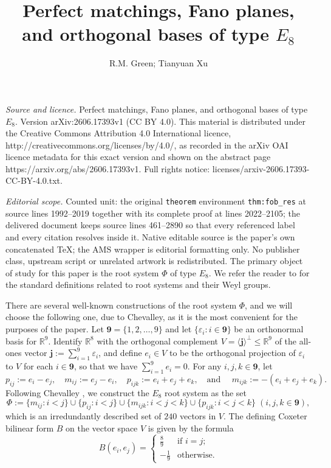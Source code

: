 \documentclass[10pt,a4paper]{amsart}
\numberwithin{equation}{section}
\newcommand{\ep}{\varepsilon}
\newcommand{\R}{{\mathbb R}}
\newcommand{\allroots}{\Phi}
\newcommand{\bfj}{\mathbf{j}}
\newcommand{\mr}{m}
\newcommand{\pr}{p}
\newcommand{\nine}{\mathbf{9}}
\begin{document}
\title[Perfect matchings, Fano planes, and orthogonal bases of type]{Perfect matchings, Fano planes, and orthogonal bases of type $E_8$}
\author{R.M. Green; Tianyuan Xu}
\date{}
\maketitle
\noindent\emph{Source and licence.} Perfect matchings, Fano planes, and orthogonal bases of type $E_8$. Version arXiv:2606.17393v1 (CC BY 4.0). This material is distributed under the Creative Commons Attribution 4.0 International licence, http://creativecommons.org/licenses/by/4.0/, as recorded in the arXiv OAI licence metadata for this exact version and shown on the abstract page https://arxiv.org/abs/2606.17393v1. Full rights notice: licenses/arxiv-2606.17393-CC-BY-4.0.txt.\par\smallskip
\noindent\textit{Editorial scope.} Counted unit: the original \texttt{theorem} environment \texttt{thm:fob\_res} at source lines 1992--2019 together with its complete proof at lines 2022--2105; the delivered document keeps source lines 461--2890 so that every referenced label and every citation resolves inside it. Native editable source is the paper's own concatenated TeX; the AMS wrapper is editorial formatting only. No publisher class, upstream script or unrelated artwork is redistributed.
\label{sec:Phi}
The primary object of study for this paper is the root system $\allroots$ of
type $E_8$. We refer the reader to \cite[Chapters 1 and 2]{humphreys90} for the
standard definitions related to root systems and their Weyl groups.

There are several well-known constructions of the root system $\Phi$, and we
will choose the following one, due to Chevalley, as it is the most convenient
for the purposes of the paper. Let $\nine = \{1, 2, \ldots, 9\}$ and let
$\{\ep_i : i \in \nine\}$ be an orthonormal basis for $\R^9$. Identify $\R^8$
with the orthogonal complement $V = \langle \bfj \rangle^\perp \leq \R^9$ of the
all-ones vector $\bfj := \sum_{i = 1}^9 \ep_i$, and define $e_i \in V$ to be the
orthogonal projection of $\ep_i$ to $V$ for each $i\in \nine$, so that we have
$\sum_{i = 1}^9 e_i = 0$. For any $i,j,k\in \nine$, let \[\pr_{ij} := e_i -
e_j,\quad \mr_{ij} := e_j - e_i, \quad \pr_{ijk} := e_i + e_j + e_k,
\quad\text{and }\quad \mr_{ijk} := -(e_i + e_j + e_k).\] Following Chevalley
\cite[4.VII]{chevalley}, we construct the $E_8$ root system as the set 
\[
    \allroots := \{\mr_{ij} :  i < j \} \cup \{\pr_{ij} :  i < j \} \cup
    \{\mr_{ijk} :  i < j < k \} \cup \{\pr_{ijk} : i < j < k \} \; (i,j,k\in
    \nine),
\] 
which is an irredundantly described set of $240$ vectors in $V$. The defining
Coxeter bilinear form $B$ on the vector space $V$ is given by the formula 
\[
   B(e_i, e_j) = \begin{cases} \frac{8}{9} & \text{if } i = j;\\
  -\frac{1}{9} & \text{otherwise}.
 \end{cases}
\]
   
\end{document}
